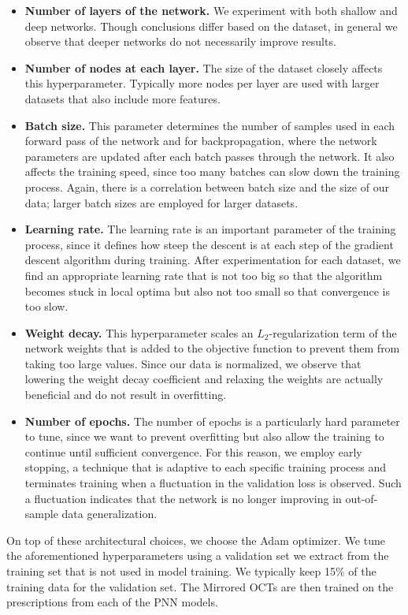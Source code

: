 \documentclass[10pt]{article} %
\begin{document}
\begin{itemize}
    \item \textbf{Number of layers of the network.} We experiment with both shallow and deep networks. Though conclusions differ based on the dataset, in general we observe that deeper networks do not necessarily improve results.
    \item \textbf{Number of nodes at each layer.} The size of the dataset closely affects this hyperparameter. Typically more nodes per layer are used with larger datasets that also include more features. 
    \item \textbf{Batch size.} This parameter determines the number of samples used in each forward pass of the network and for backpropagation, where the network parameters are updated after each batch passes through the network. It also affects the training speed, since too many batches can slow down the training process. Again, there is a correlation between batch size and the size of our data; larger batch sizes are employed for larger datasets.
    \item \textbf{Learning rate.} The learning rate is an important parameter of the training  process, since it defines how steep the descent is at each step of the gradient descent algorithm during training. After experimentation for each dataset, we find an appropriate learning rate that is not too big so that the algorithm becomes stuck in local optima but also not too small so that convergence is too slow.
    \item \textbf{Weight decay.} This hyperparameter scales an $L_2$-regularization term of the network weights that is added to the objective function to prevent them from taking too large values. Since our data is normalized, we observe that lowering the weight decay coefficient and relaxing the weights are actually beneficial and do not result in overfitting.
    \item \textbf{Number of epochs.} The number of epochs is a particularly hard parameter to tune, since we want to prevent overfitting but also allow the training to continue until sufficient convergence. For this reason, we employ early stopping, a technique that is adaptive to each specific training process and terminates training when a fluctuation in the validation loss is observed. Such a fluctuation indicates that the network is no longer improving in out-of-sample data generalization.
\end{itemize}
On top of these architectural choices, we choose the Adam optimizer. We tune the aforementioned hyperparameters using a validation set we extract from the training set that is not used in model training. We typically keep 15\% of the training data for the validation set. The Mirrored OCTs are then trained on the prescriptions from each of the PNN models.
\end{document}
